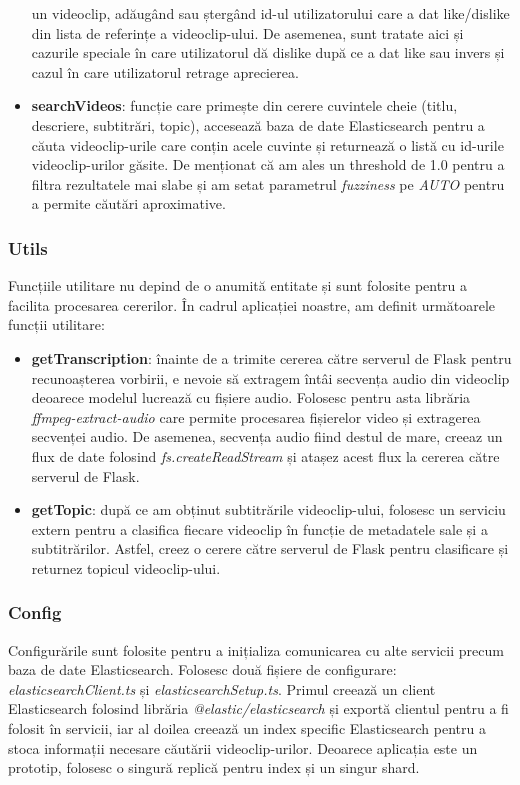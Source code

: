 \begin{itemize}
    un videoclip, adăugând sau ștergând id-ul utilizatorului care a dat like/dislike din lista de
    referințe a videoclip-ului. De asemenea, sunt tratate aici și cazurile speciale în care utilizatorul
    dă dislike după ce a dat like sau invers și cazul în care utilizatorul retrage aprecierea.
    \item \textbf{searchVideos}: funcție care primește din cerere cuvintele cheie (titlu, descriere,
    subtitrări, topic), accesează baza de date Elasticsearch pentru a căuta videoclip-urile care conțin
    acele cuvinte și returnează o listă cu id-urile videoclip-urilor găsite. De menționat că am ales
    un threshold de 1.0 pentru a filtra rezultatele mai slabe și am setat parametrul \textit{fuzziness} 
    pe \textit{AUTO} pentru a permite căutări aproximative.

    
\end{itemize}

\subsubsection{Utils}
Funcțiile utilitare nu depind de o anumită entitate și sunt folosite pentru a facilita procesarea
cererilor. În cadrul aplicației noastre, am definit următoarele funcții utilitare:

\begin{itemize}
    \item \textbf{getTranscription}: înainte de a trimite cererea către serverul de Flask pentru 
    recunoașterea vorbirii, e nevoie să extragem întâi secvența audio din videoclip deoarece 
    modelul lucrează cu fișiere audio. Folosesc pentru asta librăria \textit{ffmpeg-extract-audio}
    care permite procesarea fișierelor video și extragerea secvenței audio. De asemenea, secvența
    audio fiind destul de mare, creeaz un flux de date folosind \textit{fs.createReadStream} și 
    atașez acest flux la cererea către serverul de Flask.
    \item \textbf{getTopic}: după ce am obținut subtitrările videoclip-ului, folosesc un serviciu
    extern pentru a clasifica fiecare videoclip în funcție de metadatele sale și a subtitrărilor.
    Astfel, creez o cerere către serverul de Flask pentru clasificare și returnez topicul videoclip-ului.
\end{itemize}

\subsubsection{Config}
Configurările sunt folosite pentru a inițializa comunicarea cu alte servicii precum baza de date
Elasticsearch. Folosesc două fișiere de configurare: \textit{elasticsearchClient.ts} și
\textit{elasticsearchSetup.ts}. Primul creează un client Elasticsearch folosind librăria
\textit{@elastic/elasticsearch} și exportă clientul pentru a fi folosit în servicii, iar al doilea
creează un index specific Elasticsearch pentru a stoca informații necesare căutării videoclip-urilor.
Deoarece aplicația este un prototip, folosesc o singură replică pentru index și un singur shard.

